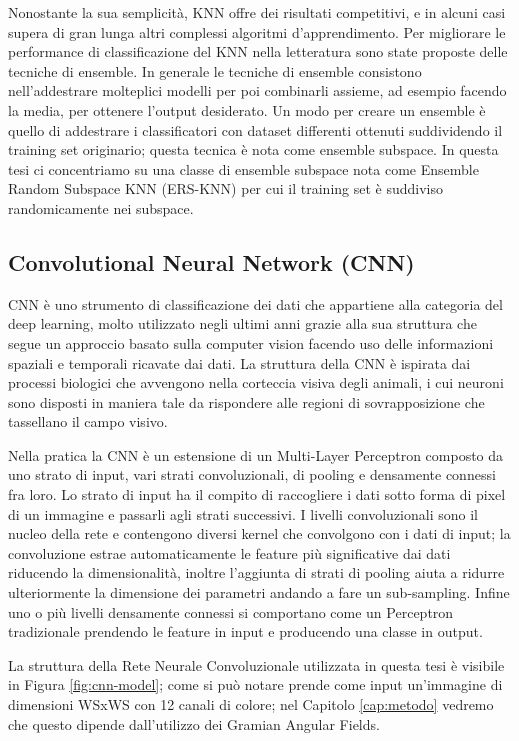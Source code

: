 Nonostante la sua semplicità, KNN offre dei risultati competitivi, e in alcuni casi supera di gran lunga altri complessi algoritmi d'apprendimento. Per migliorare le performance di classificazione del KNN nella letteratura sono state proposte delle tecniche di ensemble. In generale le tecniche di ensemble consistono nell'addestrare molteplici modelli per poi combinarli assieme, ad esempio facendo la media, per ottenere l'output desiderato. Un modo per creare un ensemble è quello di addestrare i classificatori con dataset differenti ottenuti suddividendo il training set originario; 
questa tecnica è nota come ensemble subspace. In questa tesi ci concentriamo su una classe di ensemble subspace nota come Ensemble Random Subspace KNN (ERS-KNN) per cui il training set è suddiviso randomicamente nei subspace.

\subsection{Convolutional Neural Network (CNN)}

CNN è uno strumento di classificazione dei dati che appartiene alla categoria del deep learning, molto utilizzato negli ultimi anni grazie alla sua struttura che segue un approccio basato sulla computer vision facendo uso delle informazioni spaziali e temporali ricavate dai dati. La struttura della CNN è ispirata dai processi biologici che avvengono nella corteccia visiva degli animali, i cui neuroni sono disposti in maniera tale da rispondere alle regioni di sovrapposizione che tassellano il campo visivo.

Nella pratica la CNN è un estensione di un Multi-Layer Perceptron composto da uno strato di input, vari strati convoluzionali, di pooling e densamente connessi fra loro. Lo strato di input ha il compito di raccogliere i dati sotto forma di pixel di un immagine e passarli agli strati successivi. I livelli convoluzionali sono il nucleo della rete e contengono diversi kernel che convolgono con i dati di input; la convoluzione estrae automaticamente le feature più significative dai dati riducendo la dimensionalità, inoltre l'aggiunta di strati di pooling aiuta a ridurre ulteriormente la dimensione dei parametri 
andando a fare un sub-sampling. Infine uno o più livelli densamente connessi si comportano come un Perceptron tradizionale prendendo le feature in input e producendo una classe in output.

La struttura della Rete Neurale Convoluzionale utilizzata in questa tesi è visibile in Figura \ref{fig:cnn-model}; come si può notare prende come input un'immagine di dimensioni WSxWS con 12 canali di colore; nel Capitolo \ref{cap:metodo} vedremo che questo dipende dall'utilizzo dei Gramian Angular Fields.

